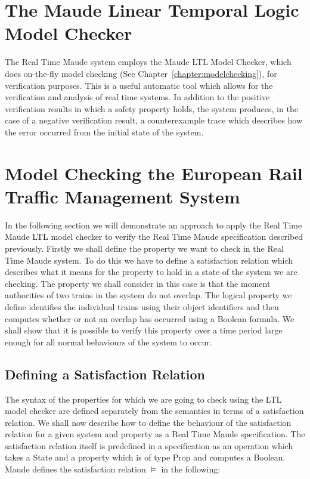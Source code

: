 \section{The Maude Linear Temporal Logic Model Checker}
The Real Time Maude system employs the Maude LTL Model Checker, which does on-the-fly model checking (See Chapter~\ref{chapter:modelchecking}), for \cite{ES00} verification purposes.  This is a useful automatic tool which allows for the verification and analysis of real time systems. In addition to the positive verification results in which a safety property holds,  the system produces, in the case of a negative verification result, a counterexample trace which describes how the error occurred from the initial state of the system.

 

\section{Model Checking the European Rail Traffic Management System}
In the following section we will demonstrate an approach to apply the Real Time Maude LTL model checker to verify the Real Time Maude specification described previously.
Firstly we shall define the property we want to check in the Real Time Maude system. To do this we have to define a satisfaction relation which describes what it means for the property to hold in a state of the system we are checking. The property we shall consider in this case is that the moment authorities of two trains in the system do not overlap. The logical property we define identifies the individual trains using their object identifiers and then computes whether or not an overlap has occurred using a Boolean formula.  We shall show that it is possible to verify this property over a time period large enough for all normal behaviours of the system to occur. 

\subsection*{Defining a Satisfaction Relation}
The syntax of the properties for which we are going to check using the LTL model checker are defined separately from the semantics in terms of a satisfaction relation.
We shall now describe how to define the behaviour of the satisfaction relation for a given system and property as a Real Time Maude specification. The satisfaction relation itself is predefined in a specification as an operation which takes a State and a property which is of type Prop and computes a Boolean. Maude defines the satisfaction relation $\models$ in the following:
\medskip

